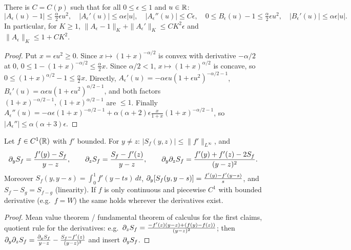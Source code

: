 \begin{lemma}
  \label{lem:c07_A_B_bounds}
  There is $C=C(p)$ such that for all $0\le\epsilon\le1$ and $u\in\mathbb{R}$:
  \[
    |A_\epsilon(u)-1|\le \tfrac\alpha2\epsilon u^2,\quad |A_\epsilon'(u)|\le\alpha\epsilon|u|,\quad
    |A_\epsilon''(u)|\le C\epsilon,\quad
    0\le B_\epsilon(u)-1\le\tfrac\alpha2\epsilon u^2,\quad |B_\epsilon'(u)|\le\alpha\epsilon|u|.
  \]
  In particular, for $K\ge1$, $\|A_\epsilon-1\|_K+\|A_\epsilon'\|_K\le C K^2\epsilon$ and $\|A_\epsilon\|_K\le 1+CK^2$.
\end{lemma}
\begin{proof}
  Put $x=\epsilon u^2\ge0$. Since $x\mapsto(1+x)^{-\alpha/2}$ is convex with derivative $-\alpha/2$ at
  $0$, $0\le1-(1+x)^{-\alpha/2}\le\frac\alpha2x$. Since $\alpha/2<1$, $x\mapsto(1+x)^{\alpha/2}$
  is concave, so $0\le(1+x)^{\alpha/2}-1\le\frac\alpha2x$. Directly,
  $A_\epsilon'(u)=-\alpha\epsilon u(1+\epsilon u^2)^{-\alpha/2-1}$,
  $B_\epsilon'(u)=\alpha\epsilon u(1+\epsilon u^2)^{\alpha/2-1}$, and both factors
  $(1+x)^{-\alpha/2-1},(1+x)^{\alpha/2-1}$ are $\le1$. Finally
  $A_\epsilon''(u)=-\alpha\epsilon(1+x)^{-\alpha/2-1}+\alpha(\alpha+2)\epsilon\frac{x}{1+x}(1+x)^{-\alpha/2-1}$,
  so $|A_\epsilon''|\le\alpha(\alpha+3)\epsilon$.
\end{proof}

\begin{lemma}
  \label{lem:c07_secant_calculus}
  Let $f\in C^1(\mathbb{R})$ with $f'$ bounded. For $y\ne z$: $|S_f(y,z)|\le\|f'\|_{L^\infty}$, and
  \[
    \partial_yS_f=\frac{f'(y)-S_f}{y-z},\qquad \partial_zS_f=\frac{S_f-f'(z)}{y-z},\qquad
    \partial_y\partial_zS_f=\frac{f'(y)+f'(z)-2S_f}{(y-z)^2}.
  \]
  Moreover $S_f(y,y-s)=\int_0^1f'(y-ts)\,dt$, $\partial_y[S_f(y,y-s)]=\frac{f'(y)-f'(y-s)}{s}$, and
  $S_f-S_g=S_{f-g}$ (linearity). If $f$ is only continuous and piecewise $C^1$ with bounded
  derivative (e.g.\ $f=W$) the same holds wherever the derivatives exist.
\end{lemma}
\begin{proof}
  Mean value theorem / fundamental theorem of calculus for the first claims, quotient rule for the
  derivatives: e.g.\ $\partial_zS_f=\frac{-f'(z)(y-z)+(f(y)-f(z))}{(y-z)^2}$; then
  $\partial_y\partial_zS_f=\frac{\partial_yS_f}{y-z}-\frac{S_f-f'(z)}{(y-z)^2}$ and insert $\partial_yS_f$.
\end{proof}

